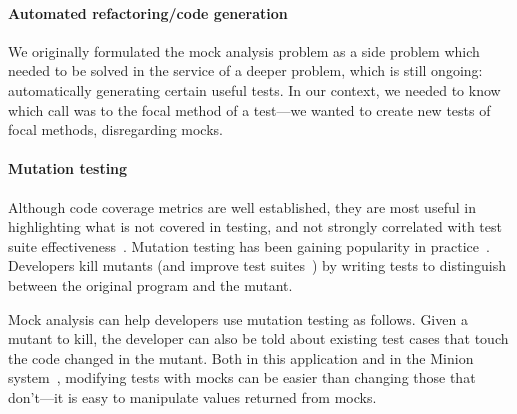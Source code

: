 \paragraph{Automated refactoring/code generation}
We originally formulated the mock analysis problem as a side problem which needed
to be solved in the service of a deeper problem, which is still
ongoing: automatically generating certain useful tests. In our context,
we needed to know which call was to the focal method of a test---we
wanted to create new tests of focal methods,
disregarding mocks.

\paragraph{Mutation testing}
Although code coverage metrics are well established, they are most useful in highlighting what is not covered in testing, and not strongly correlated with test suite effectiveness~\cite{inozemtseva14:_cover_not_stron_correl_test_suite_effec}. Mutation testing has been gaining popularity in practice~\cite{petrovic55:_pract_mutat_testin_scale,beller2021use}.
Developers kill mutants (and improve test suites~\cite{Petrovic:mutation_testing}) by writing tests to distinguish between the original program and the mutant. 

Mock analysis can help developers use mutation testing as follows. Given a mutant to kill, the developer can also be told about existing test cases that touch the code changed in the mutant. Both in this application and in the {\sc Minion} system~\cite{samak16:_direc_synth_failin_concur_execut}, modifying tests with mocks can be easier than changing those that don't---it is easy to manipulate values returned from mocks.



